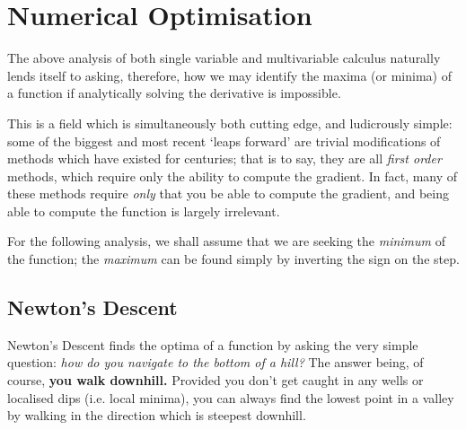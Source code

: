 \documentclass[a4paper,openany,11pt]{book}
\renewcommand\vec[1]{\boldsymbol{\mathbf{#1}}}
\begin{document}

		
		\chapter{Numerical Optimisation}
	
			The above analysis of both single variable and multivariable calculus naturally lends itself to asking, therefore, how we may identify the maxima (or minima) of a function if analytically solving the derivative is impossible. 
	
			This is a field which is simultaneously both cutting edge, and ludicrously simple: some of the biggest and most recent `leaps forward' are trivial modifications of methods which have existed for centuries; that is to say, they are all \textit{first order} methods, which require only the ability to compute the gradient. In fact, many of these methods require \textit{only} that you be able to compute the gradient, and being able to compute the function is largely irrelevant. 
	
			For the following analysis, we shall assume that we are seeking the \textit{minimum} of the function; the \textit{maximum} can be found simply by inverting the sign on the step. 
			
			\section{Newton's Descent}
				Newton's Descent finds the optima of a function by asking the very simple question: \textit{how do you navigate to the bottom of a hill?} The answer being, of course, \textbf{you walk downhill.} Provided you don't get caught in any wells or localised dips (i.e. local minima), you can always find the lowest point in a valley by walking in the direction which is steepest downhill. 
	
\end{document}
